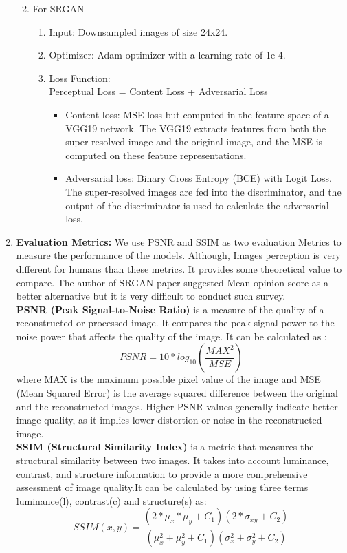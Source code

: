 \begin{enumerate}
\begin{enumerate}
\begin{enumerate}
        \end{enumerate}
        \item For SRGAN
        \begin{enumerate}
            \item Input: Downsampled images of size 24x24.
            \item Optimizer: Adam optimizer with a learning rate of 1e-4.
            \item Loss Function: \\
            Perceptual Loss = Content Loss + Adversarial Loss
            \begin{itemize}
                \item Content loss: MSE loss but computed in the feature space of a VGG19 network. The VGG19 extracts features from both the super-resolved image and the original image, and the MSE is computed on these feature representations.
                \item Adversarial loss: Binary Cross Entropy (BCE) with Logit Loss. The super-resolved images are fed into the discriminator, and the output of the discriminator is used to calculate the adversarial loss.
            \end{itemize}
        \end{enumerate}
    \end{enumerate}
    \item {\bf Evaluation Metrics:} We use PSNR and SSIM as two evaluation Metrics to measure the performance of the models. Although, Images perception is very different for humans than these metrics. It provides some theoretical value to compare. The author of SRGAN paper suggested Mean opinion score as a better alternative but it is very difficult to conduct such survey.\\
    {\bf PSNR (Peak Signal-to-Noise Ratio)} is a measure of the quality of a reconstructed or processed image. It compares the peak signal power to the noise power that affects the quality of the image. It can be calculated as :
    \begin{equation}
        PSNR = 10*log_{10}(\frac{MAX^{2}}{MSE})
    \end{equation}
        where MAX is the maximum possible pixel value of the image and MSE (Mean Squared Error) is the average squared difference between the original and the reconstructed images. Higher PSNR values generally indicate better image quality, as it implies lower distortion or noise in the reconstructed image.\\
    { \bf SSIM (Structural Similarity Index)} is a metric that measures the structural similarity between two images. It takes into account luminance, contrast, and structure information to provide a more comprehensive assessment of image quality.It can be calculated by using three terms luminance(l), contrast(c) and structure(s) as:
    \begin{equation}
        SSIM(x,y)= \frac{(2*\mu _x*\mu _y+C_1)(2*\sigma_{xy}+C_2)}{(\mu_x^2+\mu_y^2+C_1)(\sigma_x^2+\sigma_y^2+C_2)}
    \end{equation}
    

\end{enumerate}
